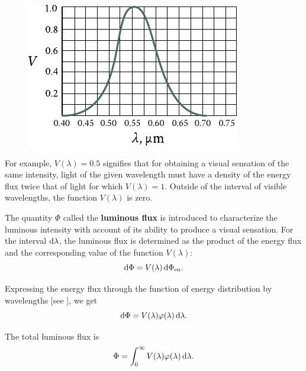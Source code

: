 \begin{figure}[t]
	\begin{center}
		\includegraphics[scale=1]{figures/ch_16/fig_16_3.pdf}
		\caption[]{}
		\label{fig:16_3}
	\end{center}
	\vspace{-0.8cm}
\end{figure}

\noindent
For example, $V(\lambda) = 0.5$ signifies that for obtaining a visual sensation of the same intensity, light of the given wavelength must have a density of the energy flux twice that of light for which $V(\lambda)=1$.
Outside of the interval of visible wavelengths, the function $V(\lambda)$ is zero.

The quantity $\Phi$ called the \textbf{luminous flux} is introduced to characterize the luminous intensity with account of its ability to produce a
visual sensation.
For the interval $\mathrm{d}\lambda$, the luminous flux is determined as the product of the energy flux and the corresponding value of the function $V(\lambda)$:
\begin{equation}\label{eq:16_37}
    \mathrm{d}\Phi = V(\lambda)\, \mathrm{d}\Phi_{\text{en}}.
\end{equation}

\noindent
Expressing the energy flux through the function of energy distribution by wavelengths [see ], we get
\begin{equation}\label{eq:16_38}
    \mathrm{d}\Phi = V(\lambda) \varphi(\lambda)\, \mathrm{d}\lambda.
\end{equation}

\noindent
The total luminous flux is
\begin{equation}\label{eq:16_39}
    \Phi = \int_0^{\infty} V(\lambda) \varphi(\lambda)\, \mathrm{d}\lambda.
\end{equation}

